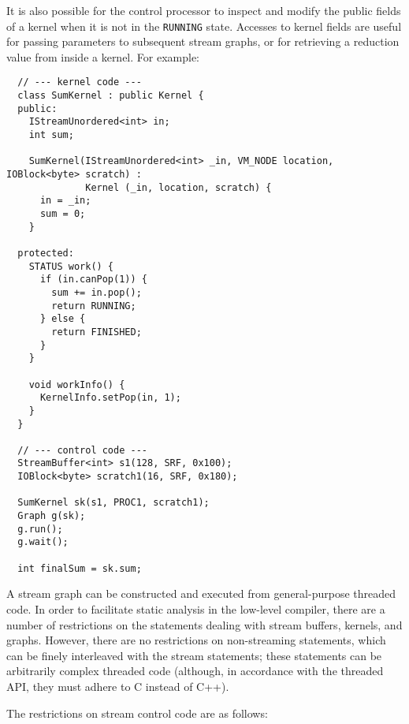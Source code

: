 It is also possible for the control processor to inspect and modify
the public fields of a kernel when it is not in the {\tt RUNNING}
state.  Accesses to kernel fields are useful for passing parameters to
subsequent stream graphs, or for retrieving a reduction value from
inside a kernel.  For example: 
{\small
\begin{verbatim}
  // --- kernel code ---
  class SumKernel : public Kernel {
  public:
    IStreamUnordered<int> in;
    int sum;

    SumKernel(IStreamUnordered<int> _in, VM_NODE location, IOBlock<byte> scratch) : 
              Kernel (_in, location, scratch) {
      in = _in;
      sum = 0;
    }

  protected:
    STATUS work() {
      if (in.canPop(1)) {
        sum += in.pop();
        return RUNNING;
      } else {
        return FINISHED;
      }
    }

    void workInfo() {
      KernelInfo.setPop(in, 1);
    }
  }

  // --- control code ---
  StreamBuffer<int> s1(128, SRF, 0x100);
  IOBlock<byte> scratch1(16, SRF, 0x180);

  SumKernel sk(s1, PROC1, scratch1);
  Graph g(sk);
  g.run();
  g.wait();

  int finalSum = sk.sum;
\end{verbatim}}


A stream graph can be constructed and executed from general-purpose
threaded code.  In order to facilitate static analysis in the
low-level compiler, there are a number of restrictions on the
statements dealing with stream buffers, kernels, and graphs.  However,
there are no restrictions on non-streaming statements, which can be
finely interleaved with the stream statements; these statements can be
arbitrarily complex threaded code (although, in accordance with the
threaded API, they must adhere to C instead of C++).

The restrictions on stream control code are as follows:

